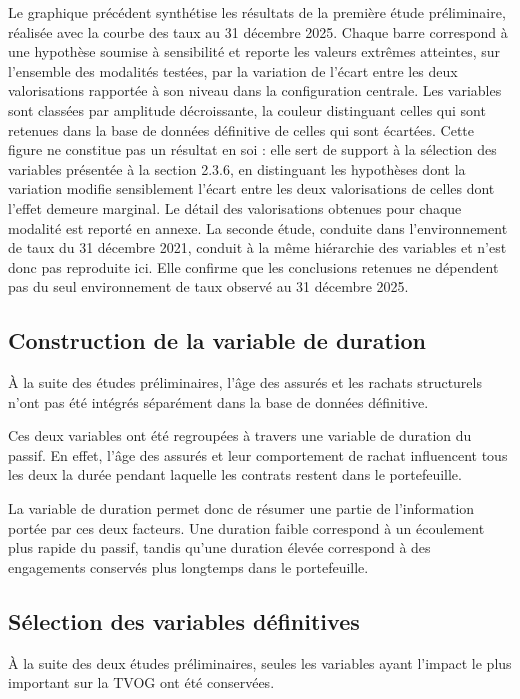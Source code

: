 Le graphique précédent synthétise les résultats de la première étude préliminaire, réalisée avec la courbe des taux au 31 décembre 2025. Chaque barre correspond à une hypothèse soumise à sensibilité et reporte les valeurs extrêmes atteintes, sur l'ensemble des modalités testées, par la variation de l'écart entre les deux valorisations rapportée à son niveau dans la configuration centrale. Les variables sont classées par amplitude décroissante, la couleur distinguant celles qui sont retenues dans la base de données définitive de celles qui sont écartées. Cette figure ne constitue pas un résultat en soi : elle sert de support à la sélection des variables présentée à la section 2.3.6, en distinguant les hypothèses dont la variation modifie sensiblement l'écart entre les deux valorisations de celles dont l'effet demeure marginal. Le détail des valorisations obtenues pour chaque modalité est reporté en annexe. La seconde étude, conduite dans l'environnement de taux du 31 décembre 2021, conduit à la même hiérarchie des variables et n'est donc pas reproduite ici. Elle confirme que les conclusions retenues ne dépendent pas du seul environnement de taux observé au 31 décembre 2025.

\subsection{Construction de la variable de duration}

À la suite des études préliminaires, l'âge des assurés et les rachats structurels n'ont pas été intégrés séparément dans la base de données définitive.

Ces deux variables ont été regroupées à travers une variable de duration du passif. En effet, l'âge des assurés et leur comportement de rachat influencent tous les deux la durée pendant laquelle les contrats restent dans le portefeuille.

La variable de duration permet donc de résumer une partie de l'information portée par ces deux facteurs. Une duration faible correspond à un écoulement plus rapide du passif, tandis qu'une duration élevée correspond à des engagements conservés plus longtemps dans le portefeuille.


\subsection{Sélection des variables définitives}

À la suite des deux études préliminaires, seules les variables ayant l'impact le plus important sur la TVOG ont été conservées.

